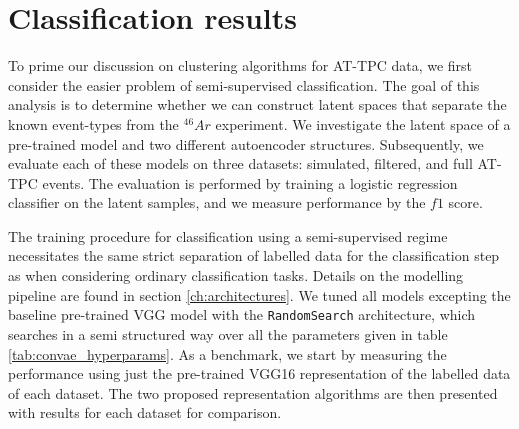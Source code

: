 
\chapter{Classification results}\label{chap:classification}

To prime our discussion on clustering algorithms for AT-TPC data, we first consider the easier problem of semi-supervised classification. The goal of this analysis is to determine whether we can construct latent spaces that separate the known event-types from the ${}^{46}Ar$ experiment. We investigate the latent space of a pre-trained model and two different autoencoder structures. Subsequently, we evaluate each of these models on three datasets: simulated, filtered, and full AT-TPC events. The evaluation is performed by training a logistic regression classifier on the latent samples, and we measure performance by the $f1$ score. 

The training procedure for classification using a semi-supervised regime necessitates the same strict separation of labelled data for the classification step as when considering ordinary classification tasks. Details on the modelling pipeline are found in section \ref{ch:architectures}. We tuned all models excepting the baseline pre-trained VGG model with the \lstinline{RandomSearch} architecture, which searches in a semi structured way over all the parameters given in table \ref{tab:convae_hyperparams}. As a benchmark, we start by measuring the performance using just the pre-trained VGG16 representation of the labelled data of each dataset. The two proposed representation algorithms are then presented with results for each dataset for comparison. 
